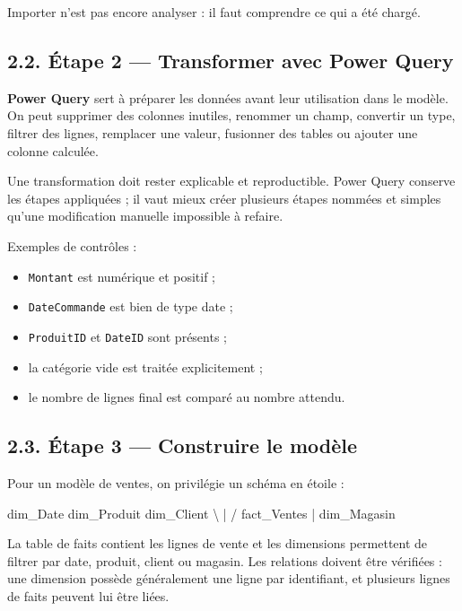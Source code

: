 \documentclass[
  french,
  letterpaper,
  open=any]{scrbook}
\newenvironment{Shaded}{\begin{snugshade}}{\end{snugshade}}
\newcommand{\NormalTok}[1]{\textcolor[rgb]{0.00,0.23,0.31}{#1}}
\providecommand{\tightlist}{%
  \setlength{\itemsep}{0pt}\setlength{\parskip}{0pt}}
\theoremstyle{definition}
\theoremstyle{definition}
\theoremstyle{remark}
\begin{document}
Importer n'est pas encore analyser : il faut comprendre ce qui a été
chargé.

\subsection{2.2. Étape 2 --- Transformer avec Power
Query}\label{uxe9tape-2-transformer-avec-power-query}

\textbf{Power Query} sert à préparer les données avant leur utilisation
dans le modèle. On peut supprimer des colonnes inutiles, renommer un
champ, convertir un type, filtrer des lignes, remplacer une valeur,
fusionner des tables ou ajouter une colonne calculée.

Une transformation doit rester explicable et reproductible. Power Query
conserve les étapes appliquées ; il vaut mieux créer plusieurs étapes
nommées et simples qu'une modification manuelle impossible à refaire.

Exemples de contrôles :

\begin{itemize}
\tightlist
\item
  \texttt{Montant} est numérique et positif ;
\item
  \texttt{DateCommande} est bien de type date ;
\item
  \texttt{ProduitID} et \texttt{DateID} sont présents ;
\item
  la catégorie vide est traitée explicitement ;
\item
  le nombre de lignes final est comparé au nombre attendu.
\end{itemize}

\subsection{2.3. Étape 3 --- Construire le
modèle}\label{uxe9tape-3-construire-le-moduxe8le}

Pour un modèle de ventes, on privilégie un schéma en étoile :

\begin{Shaded}
\begin{Highlighting}[]
\NormalTok{dim\_Date       dim\_Produit       dim\_Client}
\NormalTok{      \textbackslash{}             |             /}
\NormalTok{             fact\_Ventes}
\NormalTok{                   |}
\NormalTok{              dim\_Magasin}
\end{Highlighting}
\end{Shaded}

La table de faits contient les lignes de vente et les dimensions
permettent de filtrer par date, produit, client ou magasin. Les
relations doivent être vérifiées : une dimension possède généralement
une ligne par identifiant, et plusieurs lignes de faits peuvent lui être
liées.
\end{document}
